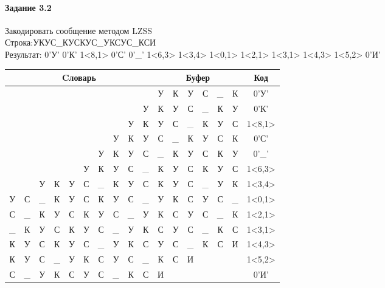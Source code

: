\documentclass[a4paper, 12pt]{article}
\begin{document}
\paragraph{Задание 3.2}

Закодировать сообщение методом LZSS\\
Строка:УКУС\_КУСКУС\_УКСУС\_КСИ\\
Результат: 0'У' 0'К' 1<8,1> 0'С' 0'\_' 1<6,3> 1<3,4> 1<0,1> 1<2,1> 1<3,1> 1<4,3> 1<5,2> 0'И'\\
\begin{table}[h!]
\centering
\begin{tabular}{|c|c|c|c|c|c|c|c|c|c|c|c|c|c|c|c|c|}
\hline
\multicolumn{10}{|c|}{Cловарь} & \multicolumn{6}{c|}{Буфер} & Код  \\ \hline
  &   &   &   &   &   &   &   &   &   & У & К & У & С & \_ & К & 0'У'\\ \hline
  &   &   &   &   &   &   &   &   & У & К & У & С & \_ & К & У & 0'К'\\ \hline
  &   &   &   &   &   &   &   & \cellcolor[HTML]{FFFF00} У & К & \cellcolor[HTML]{FFFF00} У & С & \_ & К & У & С & 1<8,1>\\ \hline
  &   &   &   &   &   &   & У & К & У & С & \_ & К & У & С & К & 0'С'\\ \hline
  &   &   &   &   &   & У & К & У & С & \_ & К & У & С & К & У & 0'\_'\\ \hline
  &   &   &   &   & У & \cellcolor[HTML]{FFFF00} К & \cellcolor[HTML]{FFFF00} У & \cellcolor[HTML]{FFFF00} С & \_ & \cellcolor[HTML]{FFFF00} К & \cellcolor[HTML]{FFFF00} У & \cellcolor[HTML]{FFFF00} С & К & У & С & 1<6,3>\\ \hline
  &   & У & \cellcolor[HTML]{FFFF00} К & \cellcolor[HTML]{FFFF00} У & \cellcolor[HTML]{FFFF00} С & \cellcolor[HTML]{FFFF00} \_ & К & У & С & \cellcolor[HTML]{FFFF00} К & \cellcolor[HTML]{FFFF00} У & \cellcolor[HTML]{FFFF00} С & \cellcolor[HTML]{FFFF00} \_ & У & К & 1<3,4>\\ \hline
\cellcolor[HTML]{FFFF00} У & С & \_ & К & У & С & К & У & С & \_ & \cellcolor[HTML]{FFFF00} У & К & С & У & С & \_ & 1<0,1>\\ \hline
С & \_ & \cellcolor[HTML]{FFFF00} К & У & С & К & У & С & \_ & У & \cellcolor[HTML]{FFFF00} К & С & У & С & \_ & К & 1<2,1>\\ \hline
\_ & К & У & \cellcolor[HTML]{FFFF00} С & К & У & С & \_ & У & К & \cellcolor[HTML]{FFFF00} С & У & С & \_ & К & С & 1<3,1>\\ \hline
К & У & С & К & \cellcolor[HTML]{FFFF00} У & \cellcolor[HTML]{FFFF00} С & \cellcolor[HTML]{FFFF00} \_ & У & К & С & \cellcolor[HTML]{FFFF00} У & \cellcolor[HTML]{FFFF00} С & \cellcolor[HTML]{FFFF00} \_ & К & С & И & 1<4,3>\\ \hline
К & У & С & \_ & У & \cellcolor[HTML]{FFFF00} К & \cellcolor[HTML]{FFFF00} С & У & С & \_ & \cellcolor[HTML]{FFFF00} К & \cellcolor[HTML]{FFFF00} С & И &   &   &   & 1<5,2>\\ \hline
С & \_ & У & К & С & У & С & \_ & К & С & И &   &   &   &   &   & 0'И'\\ \hline
\end{tabular}
\end{table}
\end{document}
